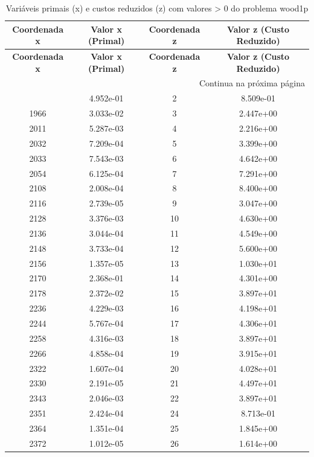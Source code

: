 \documentclass[12pt]{article}
\begin{document}
\begin{longtable}{@{}cccc@{}}
\caption{Variáveis primais (x) e custos reduzidos (z) com valores > 0 do problema wood1p} \\
\toprule
\textbf{Coordenada x} & \textbf{Valor x (Primal)} & \textbf{Coordenada z} & \textbf{Valor z (Custo Reduzido)} \\
\midrule
\endfirsthead

\toprule
\textbf{Coordenada x} & \textbf{Valor x (Primal)} & \textbf{Coordenada z} & \textbf{Valor z (Custo Reduzido)} \\
\midrule
\endhead

\midrule \multicolumn{4}{r}{{Continua na próxima página}} \\ \midrule
\endfoot

\bottomrule
\endlastfoot
1945 & 4.952e-01 & 2 & 8.509e-01 \\
1966 & 3.033e-02 & 3 & 2.447e+00 \\
2011 & 5.287e-03 & 4 & 2.216e+00 \\
2032 & 7.209e-04 & 5 & 3.399e+00 \\
2033 & 7.543e-03 & 6 & 4.642e+00 \\
2054 & 6.125e-04 & 7 & 7.291e+00 \\
2108 & 2.008e-04 & 8 & 8.400e+00 \\
2116 & 2.739e-05 & 9 & 3.047e+00 \\
2128 & 3.376e-03 & 10 & 4.630e+00 \\
2136 & 3.044e-04 & 11 & 4.549e+00 \\
2148 & 3.733e-04 & 12 & 5.600e+00 \\
2156 & 1.357e-05 & 13 & 1.030e+01 \\
2170 & 2.368e-01 & 14 & 4.301e+00 \\
2178 & 2.372e-02 & 15 & 3.897e+01 \\
2236 & 4.229e-03 & 16 & 4.198e+01 \\
2244 & 5.767e-04 & 17 & 4.306e+01 \\
2258 & 4.316e-03 & 18 & 3.897e+01 \\
2266 & 4.858e-04 & 19 & 3.915e+01 \\
2322 & 1.607e-04 & 20 & 4.028e+01 \\
2330 & 2.191e-05 & 21 & 4.497e+01 \\
2343 & 2.046e-03 & 22 & 3.897e+01 \\
2351 & 2.424e-04 & 24 & 8.713e-01 \\
2364 & 1.351e-04 & 25 & 1.845e+00 \\
2372 & 1.012e-05 & 26 & 1.614e+00 \\

\end{longtable}
\end{document}
